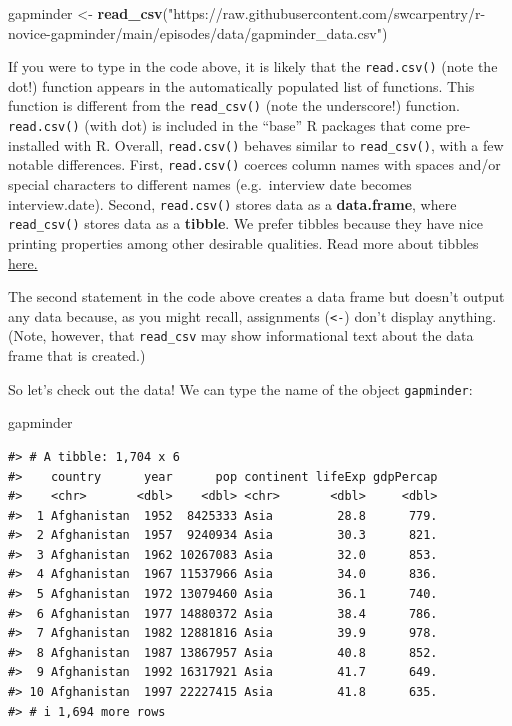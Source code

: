 \documentclass[
]{book}
\newenvironment{Shaded}{\begin{snugshade}}{\end{snugshade}}
\newcommand{\FunctionTok}[1]{\textcolor[rgb]{0.13,0.29,0.53}{\textbf{#1}}}
\newcommand{\NormalTok}[1]{#1}
\newcommand{\OtherTok}[1]{\textcolor[rgb]{0.56,0.35,0.01}{#1}}
\newcommand{\StringTok}[1]{\textcolor[rgb]{0.31,0.60,0.02}{#1}}
\begin{document}
\begin{Shaded}
\begin{Highlighting}[]
\NormalTok{gapminder }\OtherTok{\textless{}{-}} \FunctionTok{read\_csv}\NormalTok{(}\StringTok{"https://raw.githubusercontent.com/swcarpentry/r{-}novice{-}gapminder/main/episodes/data/gapminder\_data.csv"}\NormalTok{)}
\end{Highlighting}
\end{Shaded}

If you were to type in the code above, it is likely that the \texttt{read.csv()} (note the dot!) function appears in the automatically populated list of functions. This function is different from the \texttt{read\_csv()} (note the underscore!) function. \texttt{read.csv()} (with dot) is included in the ``base'' R packages that come pre-installed with R. Overall, \texttt{read.csv()} behaves similar to \texttt{read\_csv()}, with a few notable differences. First, \texttt{read.csv()} coerces column names with spaces and/or special characters to different names (e.g.~interview date becomes interview.date). Second, \texttt{read.csv()} stores data as a \textbf{data.frame}, where \texttt{read\_csv()} stores data as a \textbf{tibble}. We prefer tibbles because they have nice printing properties among other desirable qualities. Read more about tibbles \href{https://tibble.tidyverse.org/}{here.}

The second statement in the code above creates a data frame but doesn't output any data because, as you might recall, assignments (\texttt{\textless{}-}) don't display anything. (Note, however, that \texttt{read\_csv} may show informational text about the data frame that is created.)

So let's check out the data! We can type the name of the object \texttt{gapminder}:

\begin{Shaded}
\begin{Highlighting}[]
\NormalTok{gapminder}
\end{Highlighting}
\end{Shaded}

\begin{verbatim}
#> # A tibble: 1,704 x 6
#>    country      year      pop continent lifeExp gdpPercap
#>    <chr>       <dbl>    <dbl> <chr>       <dbl>     <dbl>
#>  1 Afghanistan  1952  8425333 Asia         28.8      779.
#>  2 Afghanistan  1957  9240934 Asia         30.3      821.
#>  3 Afghanistan  1962 10267083 Asia         32.0      853.
#>  4 Afghanistan  1967 11537966 Asia         34.0      836.
#>  5 Afghanistan  1972 13079460 Asia         36.1      740.
#>  6 Afghanistan  1977 14880372 Asia         38.4      786.
#>  7 Afghanistan  1982 12881816 Asia         39.9      978.
#>  8 Afghanistan  1987 13867957 Asia         40.8      852.
#>  9 Afghanistan  1992 16317921 Asia         41.7      649.
#> 10 Afghanistan  1997 22227415 Asia         41.8      635.
#> # i 1,694 more rows
\end{verbatim}
\end{document}
